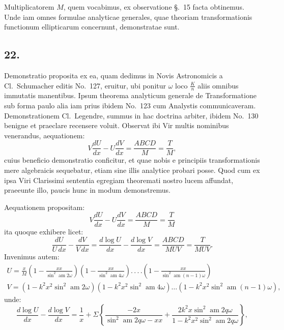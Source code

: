 \documentclass{article}
\begin{document}
Multiplicatorem $M$, quem vocabimus, ex observatione §.\ 15 facta obtinemus. Unde iam omnes formulae analyticae generales, quae theoriam transformationis functionum ellipticarum concernunt, demonstratae sunt.

\subsection*{22.}

Demonstratio proposita ex ea, quam dedimus in Novis Astronomicis a Cl.\ Schumacher editis No.\ 127, eruitur, ubi ponitur $\omega$ loco $\frac{K}{n}$ aliis omnibus immutatis manentibus. Ipsum theorema analyticum generale de Transformatione sub forma paulo alia iam prius ibidem No.\ 123 cum Analystis communicaveram. Demonstrationem Cl.\ Legendre, summus in hac doctrina arbiter, ibidem No.\ 130 benigne et praeclare recensere voluit. Observat ibi Vir multis nominibus venerandus, aequationem:
\[
V\frac{dU}{dx}-U\frac{dV}{dx}=\frac{ABCD}{M}=\frac{T}{M},
\]
cuius beneficio demonstratio conficitur, et quae nobis e principiis transformationis mere algebraicis sequebatur, etiam sine illis analytice probari posse. Quod cum ex ipsa Viri Clarissimi sententia egregiam theoremati nostro lucem affundat, praeeunte illo, paucis hunc in modum demonstremus.

Aequationem propositam:
\[
V\frac{dU}{dx}-U\frac{dV}{dx}=\frac{ABCD}{M}=\frac{T}{M}
\]
ita quoque exhibere licet:
\[
\frac{dU}{U\,dx}-\frac{dV}{V\,dx}=\frac{d\log U}{dx}-\frac{d\log V}{dx}=\frac{ABCD}{MUV}=\frac{T}{MUV}.
\]
Invenimus autem:
\[
\begin{gathered}
U=\frac{x}{M}\left(1-\frac{xx}{\sin^{2}\operatorname{am}2\omega}\right)\left(1-\frac{xx}{\sin^{2}\operatorname{am}4\omega}\right).\,.\,.\,.\left(1-\frac{xx}{\sin^{2}\operatorname{am}(n-1)\omega}\right)\\[1.5ex]
V=\left(1-k^{2}x^{2}\sin^{2}\operatorname{am}2\omega\right)\left(1-k^{2}x^{2}\sin^{2}\operatorname{am}4\omega\right)\ldots\left(1-k^{2}x^{2}\sin^{2}\operatorname{am}(n-1)\omega\right),
\end{gathered}
\]
unde:
\[
\frac{d\log U}{dx}-\frac{d\log V}{dx}=\frac{1}{x}+\Sigma\left\{\frac{-2x}{\sin^{2}\operatorname{am}2q\omega-xx}+\frac{2k^{2}x\sin^{2}\operatorname{am}2q\omega}{1-k^{2}x^{2}\sin^{2}\operatorname{am}2q\omega}\right\},
\]
\end{document}
